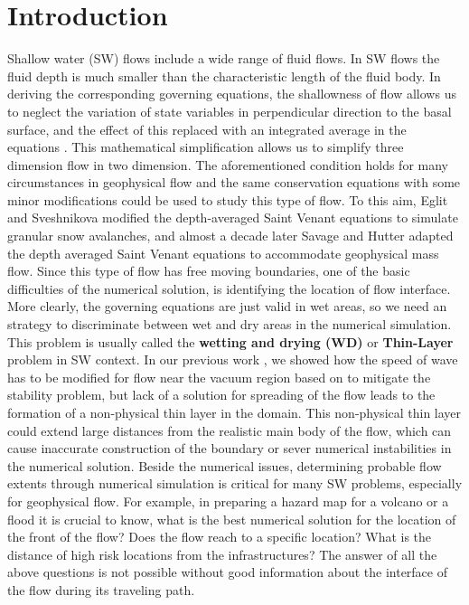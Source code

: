 \documentclass[letterpaper,10pt]{article}
\begin{document}
\section{Introduction} 
\label{introduction}
Shallow water (SW) flows include a wide range of fluid flows. In SW flows the fluid depth is much 
smaller than the characteristic length of the fluid body. In deriving the corresponding 
governing equations, the shallowness of flow allows us to neglect the variation of state variables  in perpendicular direction to the basal surface, and the effect of 
this replaced with an integrated average in the equations \cite{SavageHutter1989}. 
This mathematical simplification allows us to simplify three dimension flow in two dimension.
The aforementioned condition holds for many circumstances in geophysical flow and the same 
conservation equations with some minor modifications could be used to study this type of flow. \newline
To this aim, Eglit and Sveshnikova \cite{eglit1980mms} modified the depth-averaged Saint Venant equations to simulate granular snow avalanches, and almost a decade later Savage and Hutter \cite{SavageHutter1989} adapted the depth averaged Saint Venant equations to accommodate  geophysical mass flow. 
Since this type of flow has free moving boundaries, one of the basic difficulties 
of the numerical solution, is identifying the location of flow interface. 
More clearly, the governing equations are just valid in wet areas, so we need an strategy to discriminate between wet and dry areas in the numerical simulation. 
This problem is usually called the {\bf wetting and drying (WD)} or {\bf Thin-Layer} problem in SW context. In our previous work \cite{Patra2005}, we showed how the speed of wave has to be modified for flow near the vacuum region based on \cite{ToroBook2001} to mitigate the stability problem, but lack of a solution for spreading of the flow leads to the formation of a non-physical thin layer in the domain.
This non-physical thin layer could extend large distances from the realistic main 
body of the flow, which can cause inaccurate construction of the boundary or sever 
numerical instabilities in the numerical solution.\newline
Beside the numerical issues, determining probable flow extents through numerical simulation is critical for many SW problems, especially for geophysical flow. For example, in preparing a hazard map for a volcano or a flood it is crucial to know, what is the best numerical solution for the location of the front of the flow? Does the flow reach to a specific location? What is the distance of high risk locations from the infrastructures? \newline
The answer of all the above questions is not possible without good information about the interface of the flow during its traveling path.\newline
\end{document}
